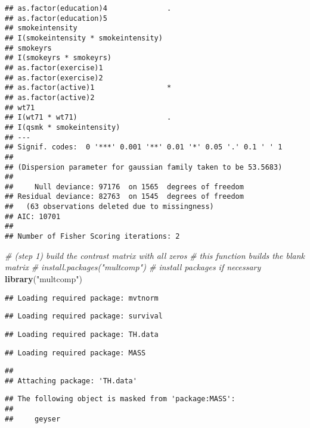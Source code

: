 \documentclass[10pt,]{book}
\newenvironment{Shaded}{\begin{snugshade}}{\end{snugshade}}
\newcommand{\CommentTok}[1]{\textcolor[rgb]{0.56,0.35,0.01}{\textit{#1}}}
\newcommand{\KeywordTok}[1]{\textcolor[rgb]{0.13,0.29,0.53}{\textbf{#1}}}
\newcommand{\NormalTok}[1]{#1}
\newcommand{\StringTok}[1]{\textcolor[rgb]{0.31,0.60,0.02}{#1}}
\begin{document}
\begin{verbatim}
## as.factor(education)4              .  
## as.factor(education)5                 
## smokeintensity                        
## I(smokeintensity * smokeintensity)    
## smokeyrs                              
## I(smokeyrs * smokeyrs)                
## as.factor(exercise)1                  
## as.factor(exercise)2                  
## as.factor(active)1                 *  
## as.factor(active)2                    
## wt71                                  
## I(wt71 * wt71)                     .  
## I(qsmk * smokeintensity)              
## ---
## Signif. codes:  0 '***' 0.001 '**' 0.01 '*' 0.05 '.' 0.1 ' ' 1
## 
## (Dispersion parameter for gaussian family taken to be 53.5683)
## 
##     Null deviance: 97176  on 1565  degrees of freedom
## Residual deviance: 82763  on 1545  degrees of freedom
##   (63 observations deleted due to missingness)
## AIC: 10701
## 
## Number of Fisher Scoring iterations: 2
\end{verbatim}

\begin{Shaded}
\begin{Highlighting}[]
\CommentTok{# (step 1) build the contrast matrix with all zeros}
\CommentTok{# this function builds the blank matrix }
\CommentTok{# install.packages("multcomp") # install packages if necessary}
\KeywordTok{library}\NormalTok{(}\StringTok{"multcomp"}\NormalTok{)}
\end{Highlighting}
\end{Shaded}

\begin{verbatim}
## Loading required package: mvtnorm
\end{verbatim}

\begin{verbatim}
## Loading required package: survival
\end{verbatim}

\begin{verbatim}
## Loading required package: TH.data
\end{verbatim}

\begin{verbatim}
## Loading required package: MASS
\end{verbatim}

\begin{verbatim}
## 
## Attaching package: 'TH.data'
\end{verbatim}

\begin{verbatim}
## The following object is masked from 'package:MASS':
## 
##     geyser
\end{verbatim}
\end{document}
